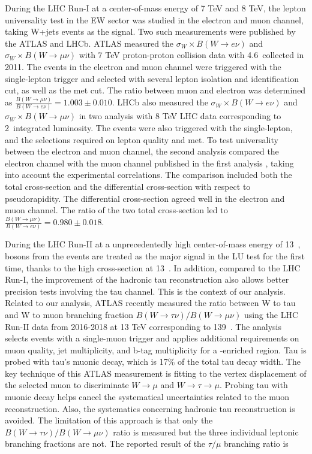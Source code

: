 During the LHC Run-I at a center-of-mass energy of 7 TeV and 8 TeV, the lepton universality test in the EW sector was studied in the electron and muon channel, taking W+jets events as the signal. Two such measurements were published by the ATLAS and LHCb. ATLAS measured the $\sigma_W \times B(W \to e \nu)$ and $\sigma_W \times B(W \to \mu \nu)$ \cite{Aaboud:2016btc} with 7 TeV proton-proton collision data with 4.6~\fbinv collected in 2011. The events in the electron and muon channel were triggered with the single-lepton trigger and selected with several lepton isolation and identification cut, as well as the met cut. The ratio between muon and electron was determined as $\frac{ B(W  \to \mu \nu) }{ B(W \to e \nu)} = 1.003\pm 0.010$. LHCb also measured the $\sigma_W \times B(W \to e \nu)$ \cite{Aaij:2016qqz} and $\sigma_W \times B(W \to \mu \nu)$ \cite{Aaij:2015zlq} in two analysis with 8 TeV LHC data corresponding to 2~\fbinv integrated luminosity. The events were also triggered with the single-lepton, and the selections required on lepton quality and met. To test universality between the electron and muon channel, the second analysis \cite{Aaij:2016qqz} compared the electron channel with the muon channel published in the first analysis \cite{Aaij:2015zlq}, taking into account the experimental correlations. The comparison included both the total cross-section and the differential cross-section with respect to pseudorapidity. The differential cross-section agreed well in the electron and muon channel. The ratio of the two total cross-section led to $\frac{ B(W  \to \mu \nu) }{ B(W \to e \nu)}  = 0.980 \pm 0.018 $.




During the LHC Run-II at a unprecedentedly high center-of-mass energy of 13~\TeV, \PW bosons from the \ttbar events are treated as the major signal in the LU test for the first time, thanks to the high \ttbar cross-section at 13~\TeV. In addition, compared to the LHC Run-I, the improvement of the hadronic tau reconstruction also allows better precision tests involving the tau channel. This is the context of our analysis. Related to our analysis, ATLAS recently measured the ratio between W to tau and W to muon branching fraction $B(W  \to \tau \nu) / B(W \to \mu \nu) $ using the LHC Run-II data from 2016-2018 at 13 TeV corresponding to 139~\fbinv. The analysis selects \ttbar events with a single-muon trigger and applies additional requirements on muon quality, jet multiplicity, and b-tag multiplicity for a \ttbar-enriched region. Tau is probed with tau's muonic decay, which is 17\% of the total tau decay width. The key technique of this ATLAS measurement is fitting to the vertex displacement of the selected muon to discriminate $W \to \mu$ and $W \to \tau \to \mu$. Probing tau with muonic decay helps cancel the systematical uncertainties related to the muon reconstruction. Also, the systematics concerning hadronic tau reconstruction is avoided. The limitation of this approach is that only the $B(W  \to \tau \nu) / B(W \to \mu \nu) $ ratio is measured but the three individual leptonic branching fractions are not. The reported result of the $\tau / \mu $ branching ratio is

